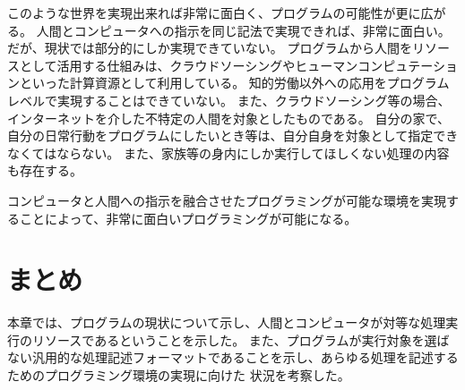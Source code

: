 このような世界を実現出来れば非常に面白く、プログラムの可能性が更に広がる。
人間とコンピュータへの指示を同じ記法で実現できれば、非常に面白い。
だが、現状では部分的にしか実現できていない。
プログラムから人間をリソースとして活用する仕組みは、クラウドソーシングやヒューマンコンピュテーションといった計算資源として利用している。
知的労働以外への応用をプログラムレベルで実現することはできていない。
また、クラウドソーシング等の場合、インターネットを介した不特定の人間を対象としたものである。
自分の家で、自分の日常行動をプログラムにしたいとき等は、自分自身を対象として指定できなくてはならない。
また、家族等の身内にしか実行してほしくない処理の内容も存在する。

コンピュータと人間への指示を融合させたプログラミングが可能な環境を実現することによって、非常に面白いプログラミングが可能になる。

\section{まとめ}\label{ux307eux3068ux3081}

本章では、プログラムの現状について示し、人間とコンピュータが対等な処理実行のリソースであるということを示した。
また、プログラムが実行対象を選ばない汎用的な処理記述フォーマットであることを示し、あらゆる処理を記述するためのプログラミング環境の実現に向けた
状況を考察した。
